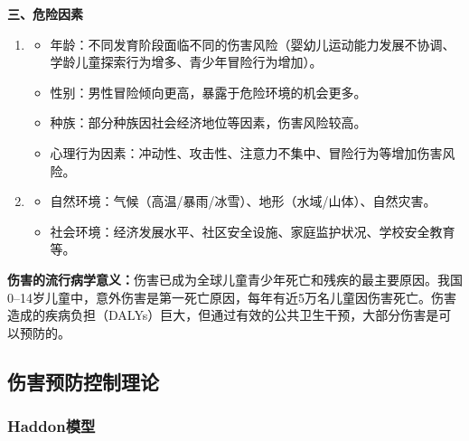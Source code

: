 \begin{keybox}
\textbf{三、危险因素}
\begin{enumerate}[leftmargin=*]
    \item {}
    \begin{itemize}
        \item 年龄：不同发育阶段面临不同的伤害风险（婴幼儿运动能力发展不协调、学龄儿童探索行为增多、青少年冒险行为增加）。
        \item 性别：男性冒险倾向更高，暴露于危险环境的机会更多。
        \item 种族：部分种族因社会经济地位等因素，伤害风险较高。
        \item 心理行为因素：冲动性、攻击性、注意力不集中、冒险行为等增加伤害风险。
    \end{itemize}
    \item {}
    \begin{itemize}
        \item 自然环境：气候（高温/暴雨/冰雪）、地形（水域/山体）、自然灾害。
        \item 社会环境：经济发展水平、社区安全设施、家庭监护状况、学校安全教育等。
    \end{itemize}
\end{enumerate}
\end{keybox}

\begin{tipbox}
\textbf{伤害的流行病学意义：}伤害已成为全球儿童青少年死亡和残疾的最主要原因。我国0--14岁儿童中，意外伤害是第一死亡原因，每年有近5万名儿童因伤害死亡。伤害造成的疾病负担（DALYs）巨大，但通过有效的公共卫生干预，大部分伤害是可以预防的。
\end{tipbox}

\subsection{伤害预防控制理论}

\subsubsection{Haddon模型}

